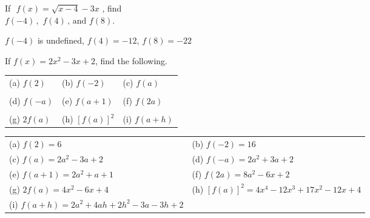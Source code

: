\begin{enumialphparenastyle}
\begin{multicols}{2}
	
	
	
\begin{ex}
If $\,\, f(x) = \sqrt{x-4}-3x \,\,$, find \\
$f(-4)\, , \,\, f(4) \, , \, \text{and} \,\, f(8)$. 

\begin{sol}
	$f(-4)$ is undefined, \hspace{3mm} $f(4)=-12$, \hspace{3mm} $f(8)=-22$
\end{sol} 	
\end{ex}

\begin{ex}
If $\displaystyle{f(x)=2x^{2}-3x+2}$, find the following. \\

\begin{tabular}{lll}
(a) $f(2)$ & \hspace{2mm} (b) $f(-2)$ & \hspace{2mm} (c) $f(a)$  \\
&& \\ 
(d)  $f(-a)$ & \hspace{2mm} (e) $f(a+1)$ & \hspace{2mm} (f) $f(2a)$ \\
&& \\ 
(g) $2f(a)$ & \hspace{2mm} (h) $\displaystyle{\left[ f(a) \right]^{2}}$ & \hspace{2mm} (i) $f(a+h)$ \\
\end{tabular}

\begin{sol}
\begin{tabular}{ll}
(a) $f(2)=6$ & (b) $f(-2)=16$ \\
(c) $f(a)=2a^{2}-3a+2$  & (d)  $f(-a)=2a^{2}+3a+2$ \\
(e) $f(a+1)=2a^{2}+a+1$ & (f) $f(2a)=8a^{2}-6x+2$ \\
(g) $2f(a)=4x^{2}-6x+4$ & (h) $\displaystyle{\left[ f(a) \right]^{2}=4x^{4}-12x^{3}+17x^{2}-12x+4}$ \\
(i) $f(a+h)=2a^{2}+4ah+2h^{2}-3a-3h+2$ & \\
\end{tabular} 
\end{sol}
\end{ex}


\end{multicols}
\end{enumialphparenastyle}
